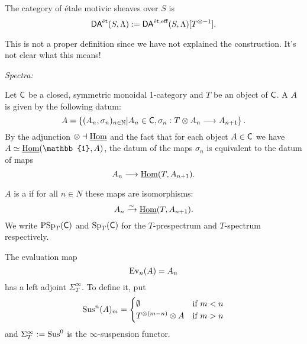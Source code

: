 \begin{definition}
The category of \'etale motivic sheaves over $S$ is
\[
\mathsf{DA}^\text{\'et}(S,\Lambda) := \mathsf{DA}^{\text{\'et},\text{eff}}(S,\Lambda)[T^{\otimes -1}].
\]
\end{definition}
This is not a proper definition since we have not explained the construction. It's not
clear what this means!

\emph{Spectra:}
\begin{definition}
Let $\mathsf{C}$ be a closed, symmetric monoidal 1-category and $T$ be an object of $\mathsf{C}$. A
 $A$ is given by the following datum:
\[
A = \left\{ (A_n,\sigma_n)_{n\in \N} | A_n\in \C, \sigma_n:T\otimes A_n\to A_{n+1} \right\} .
\]
By the adjunction $\otimes\dashv\underline{\operatorname{Hom}}$ and the fact that for each object $A\in\mathsf{C}$ we have
$A\isoto \iHom(\mathbb{1},A)$, the datum of the maps $\sigma_n$ is equivalent to the datum of maps
\[ A_n \to \iHom(T,A_{n+1}). \]

$A$ is a  if for all $n\in N$ these maps are isomorphisms:
\[
A_n \xrightarrow{\sim} \underline{\operatorname{Hom}}(T,A_{n+1}).
\]
We write $\operatorname{PSp}_T(\mathsf{C})$ and $\operatorname{Sp}_T(\mathsf{C})$ for the $T$-prespectrum and $T$-spectrum respectively.
\end{definition}
The evaluation map
\[
\operatorname{Ev}_n(A) = A_n
\]
has a left adjoint $\Sigma_T^\infty$. To define it, put
\[
\operatorname{Sus}^{n}(A)_m =
\begin{cases}
\emptyset & \text{if }m<n \\
T^{\otimes (m-n)}\otimes A & \text{if }m>n
\end{cases}
\]
and $\Sigma_T^{\infty}:= \operatorname{Sus}^{0}$ is the $\infty$-suspension functor.

